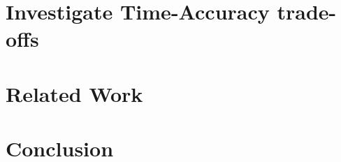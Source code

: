 \documentclass[10pt,conference]{IEEEtran}
\begin{document}




\section{Investigate Time-Accuracy trade-offs}
\label{sec:accuracy}







\section{Related Work}
\label{sec:related}



\section{Conclusion}
\label{sec:conclusions}





\end{document}
